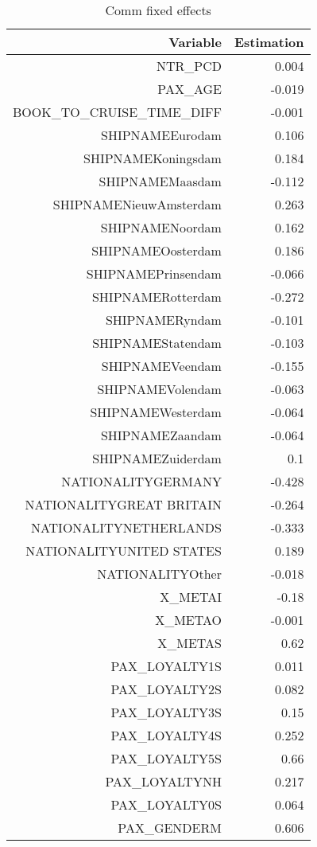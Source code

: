 \documentclass{article}
\begin{document}
\begin{table}[H]\centering
	\begin{tabular}{rr}
		Variable & Estimation \\
		\hline 
		\hline 
		NTR\_PCD & 0.004 \\
		PAX\_AGE & -0.019 \\
		BOOK\_TO\_CRUISE\_TIME\_DIFF & -0.001 \\
		SHIPNAMEEurodam & 0.106 \\
		SHIPNAMEKoningsdam & 0.184 \\
		SHIPNAMEMaasdam & -0.112 \\
		SHIPNAMENieuwAmsterdam & 0.263 \\
		SHIPNAMENoordam & 0.162 \\
		SHIPNAMEOosterdam & 0.186 \\
		SHIPNAMEPrinsendam & -0.066 \\
		SHIPNAMERotterdam & -0.272 \\
		SHIPNAMERyndam & -0.101 \\
		SHIPNAMEStatendam & -0.103 \\
		SHIPNAMEVeendam & -0.155 \\
		SHIPNAMEVolendam & -0.063 \\
		SHIPNAMEWesterdam & -0.064 \\
		SHIPNAMEZaandam & -0.064 \\
		SHIPNAMEZuiderdam & 0.1 \\
		NATIONALITYGERMANY  & -0.428 \\
		NATIONALITYGREAT BRITAIN & -0.264 \\
		NATIONALITYNETHERLANDS & -0.333 \\
		NATIONALITYUNITED STATES & 0.189 \\
		NATIONALITYOther & -0.018 \\
		X\_METAI & -0.18 \\
		X\_METAO & -0.001 \\
		X\_METAS & 0.62 \\
		PAX\_LOYALTY1S & 0.011 \\
		PAX\_LOYALTY2S & 0.082 \\
		PAX\_LOYALTY3S & 0.15 \\
		PAX\_LOYALTY4S & 0.252 \\
		PAX\_LOYALTY5S & 0.66 \\
		PAX\_LOYALTYNH & 0.217 \\
		PAX\_LOYALTY0S & 0.064 \\
		PAX\_GENDERM & 0.606 \\
		\hline 
		\hline 
	\end{tabular}
	\caption{Comm fixed effects}
\end{table}
\end{document}
